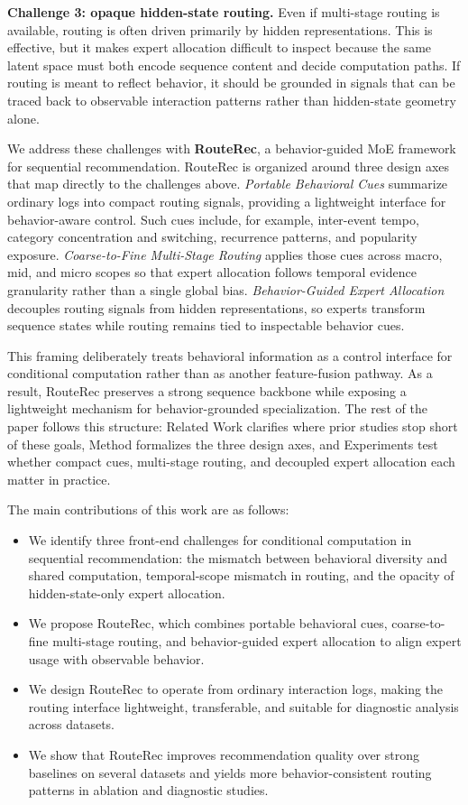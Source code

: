 \documentclass[sigconf,review,anonymous]{acmart}
\begin{document}
\textbf{Challenge 3: opaque hidden-state routing.} Even if multi-stage routing is available, routing is often driven primarily by hidden representations. This is effective, but it makes expert allocation difficult to inspect because the same latent space must both encode sequence content and decide computation paths. If routing is meant to reflect behavior, it should be grounded in signals that can be traced back to observable interaction patterns rather than hidden-state geometry alone.

We address these challenges with \textbf{RouteRec}, a behavior-guided MoE framework for sequential recommendation. RouteRec is organized around three design axes that map directly to the challenges above. \emph{Portable Behavioral Cues} summarize ordinary logs into compact routing signals, providing a lightweight interface for behavior-aware control. Such cues include, for example, inter-event tempo, category concentration and switching, recurrence patterns, and popularity exposure. \emph{Coarse-to-Fine Multi-Stage Routing} applies those cues across macro, mid, and micro scopes so that expert allocation follows temporal evidence granularity rather than a single global bias. \emph{Behavior-Guided Expert Allocation} decouples routing signals from hidden representations, so experts transform sequence states while routing remains tied to inspectable behavior cues.

This framing deliberately treats behavioral information as a control interface for conditional computation rather than as another feature-fusion pathway. As a result, RouteRec preserves a strong sequence backbone while exposing a lightweight mechanism for behavior-grounded specialization. The rest of the paper follows this structure: Related Work clarifies where prior studies stop short of these goals, Method formalizes the three design axes, and Experiments test whether compact cues, multi-stage routing, and decoupled expert allocation each matter in practice.

The main contributions of this work are as follows:
\begin{itemize}
  \item We identify three front-end challenges for conditional computation in sequential recommendation: the mismatch between behavioral diversity and shared computation, temporal-scope mismatch in routing, and the opacity of hidden-state-only expert allocation.
  \item We propose RouteRec, which combines portable behavioral cues, coarse-to-fine multi-stage routing, and behavior-guided expert allocation to align expert usage with observable behavior.
  \item We design RouteRec to operate from ordinary interaction logs, making the routing interface lightweight, transferable, and suitable for diagnostic analysis across datasets.
  \item We show that RouteRec improves recommendation quality over strong baselines on several datasets and yields more behavior-consistent routing patterns in ablation and diagnostic studies.
\end{itemize}
\end{document}
